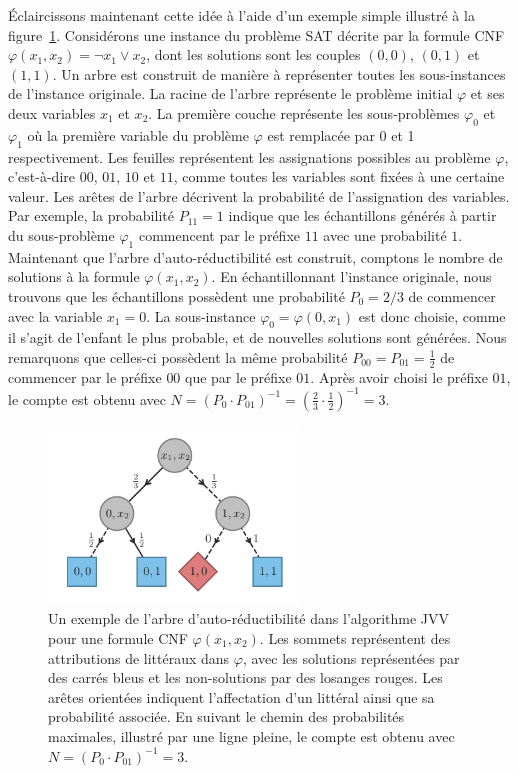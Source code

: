Éclaircissons maintenant cette idée à l'aide d'un exemple simple illustré à la figure~\ref{fig:algorithme-jvv}. Considérons une instance du problème SAT décrite par la formule CNF $\varphi(x_{1}, x_{2}) = \neg x_{1} \lor x_{2}$, dont les solutions sont les couples $(0,0)$, $(0,1)$ et $(1,1)$. Un arbre est construit de manière à représenter toutes les sous-instances de l'instance originale. La racine de l'arbre représente le problème initial $\varphi$ et ses deux variables $x_{1}$ et $x_{2}$. La première couche représente les sous-problèmes $\varphi_{0}$ et $\varphi_{1}$ où la première variable du problème $\varphi$ est remplacée par 0 et 1 respectivement. Les feuilles représentent les assignations possibles au problème $\varphi$, c'est-à-dire $00$, $01$, $10$ et $11$, comme toutes les variables sont fixées à une certaine valeur. Les arêtes de l'arbre décrivent la probabilité de l'assignation des variables. Par exemple, la probabilité $P_{11}=1$ indique que les échantillons générés à partir du sous-problème $\varphi_{1}$ commencent par le préfixe $11$ avec une probabilité $1$. Maintenant que l'arbre d'auto-réductibilité est construit, comptons le nombre de solutions à la formule $\varphi(x_{1}, x_{2})$. En échantillonnant l'instance originale, nous trouvons que les échantillons possèdent une probabilité $P_{0}=2/3$ de commencer avec la variable $x_{1} = 0$. La sous-instance $\varphi_{0} = \varphi(0, x_{1})$ est donc choisie, comme il s'agit de l'enfant le plus probable, et de nouvelles solutions sont générées. Nous remarquons que celles-ci possèdent la même probabilité $P_{00} = P_{01} =\frac{1}{2}$ de commencer par le préfixe $00$ que par le préfixe $01$. Après avoir choisi le préfixe $01$, le compte est obtenu avec $N = (P_{0} \cdot P_{01})^{-1} = (\frac{2}{3} \cdot \frac{1}{2})^{-1} = 3$.

\begin{figure}[h]
    \centering
    \includegraphics[width=0.6\textwidth]{figures/jvv-algorithm.pdf}
    \caption[Algorithme de Jerrum-Valiant-Vazirani]{Un exemple de l'arbre d'auto-réductibilité dans l'algorithme JVV pour une formule CNF $\varphi(x_{1}, x_{2})$. Les sommets représentent des attributions de littéraux dans $\varphi$, avec les solutions représentées par des carrés bleus et les non-solutions par des losanges rouges. Les arêtes orientées indiquent l'affectation d'un littéral ainsi que sa probabilité associée. En suivant le chemin des probabilités maximales, illustré par une ligne pleine, le compte est obtenu avec $N = (P_{0} \cdot P_{01})^{-1} = 3$.}
    \label{fig:algorithme-jvv}
\end{figure}

